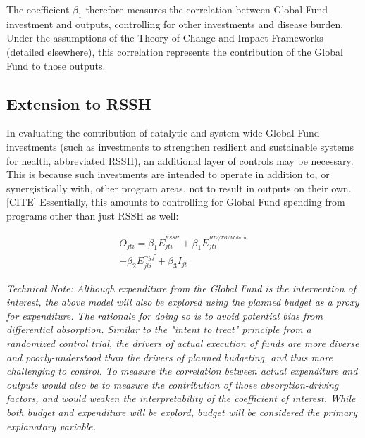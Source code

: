 \documentclass[twocolumn]{bmcart}%
\begin{document}
The coefficient $\beta_1$ therefore measures the correlation between Global Fund investment and outputs, controlling for other investments and disease burden. Under the assumptions of the Theory of Change and Impact Frameworks (detailed elsewhere), this correlation represents the contribution of the Global Fund to those outputs. \\

\subsection{Extension to RSSH}
In evaluating the contribution of catalytic and system-wide Global Fund investments (such as investments to strengthen resilient and sustainable systems for health, abbreviated RSSH), an additional layer of controls may be necessary. This is because such investments are intended to operate in addition to, or synergistically with, other program areas, not to result in outputs on their own.[CITE] %
 Essentially, this amounts to controlling for Global Fund spending from programs other than just RSSH as well:

  \begin{align}
    O_{jti} = \beta_1 E^{^{RSSH}}_{jti} + \beta_1 E^{^{HIV/TB/Malaria}}_{jti} \\
    + \beta_2 E^{\neg gf}_{jti} + \beta_3 I_{jt}
  \end{align}

\textit{Technical Note: Although expenditure from the Global Fund is the intervention of interest, the above model will also be explored using the planned budget as a proxy for expenditure. The rationale for doing so is to avoid potential bias from differential absorption. Similar to the "intent to treat" principle from a randomized control trial, the drivers of actual execution of funds are more diverse and poorly-understood than the drivers of planned budgeting, and thus more challenging to control. To measure the correlation between actual expenditure and outputs would also be to measure the contribution of those absorption-driving factors, and would weaken the interpretability of the coefficient of interest. While both budget and expenditure will be explord, budget will be considered the primary explanatory variable. \\}
\end{document}
